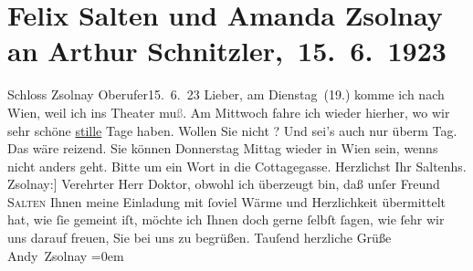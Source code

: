 

         
         \renewcommand{\erwaehntePersonen}{Personen: Frieda Pollak, Felix Salten, Amanda von Zsolnay}
         \renewcommand{\erwaehnteOrte}{Orte: Cottagegasse, Prievoz, Schloss Csáky, Wien}
         \renewcommand{\erwaehnteWerke}{}
               \section[ Felix Salten und Amanda Zsolnay an Arthur Schnitzler, 15. 6. 1923]{ Felix Salten und Amanda Zsolnay an Arthur Schnitzler, 15. 6. 1923}\nopagebreak{}\rehead{ }\begin{ledgroupsized}[t]{13cm}\normalsize\beginnumbering{} \toendnotes[C]{\smallbreak\pagebreak[2]} 
\toendnotes[C]{\smallbreak}\pstart
           \noindent{}\centering{}{\pb}{[}Schloss Zsolnay\oindex{Schloss Csáky@\textbf{Schloss Csáky}|pw}{]}\pend
           \pstart
           \raggedleft{}{\pb}Oberufer15. 6. 23\pend
           \pstart{}Lieber,\pend\pstart
           am Dienstag (19.) komme ich nach Wien, weil ich ins Theater mu\textcolor{gray}{ß}. Am Mittwoch fahre ich wieder hierher, wo wir sehr schöne \uline{stille} Tage haben. Wollen Sie nicht \label{K_L02793-1v}\label{K_L02793-1h}?
               Und sei’s auch nur überm Tag. Das wäre reizend. Sie können Donnerstag{ }Mittag wieder in Wien sein, wenns
               nicht anders geht. Bitte um ein Wort in die Cottagegasse.\pend
           \pstart Herzlichst Ihr \spacefill\mbox{Salten}\pend{}{\bigskip}\pstart{}{[}hs. Zsolnay:{]} Verehrter Herr Doktor,\pend\pstart
           obwohl ich überzeugt bin, daß unſer Freund \textsc{Salten} Ihnen
               meine Einladung mit ſoviel Wärme und Herzlichkeit übermittelt hat, wie ſie gemeint
               iſt, möchte ich Ihnen doch gerne ſelbſt ſagen, wie ſehr {\pb}wir uns darauf freuen, Sie bei
               uns zu begrüßen.\pend
           \pstart
           Tauſend herzliche Grüße {\\[\baselineskip]}\spacefill\mbox{Andy Zsolnay}\pend
           \leftskip=0em{}
         

\end{ledgroupsized}
